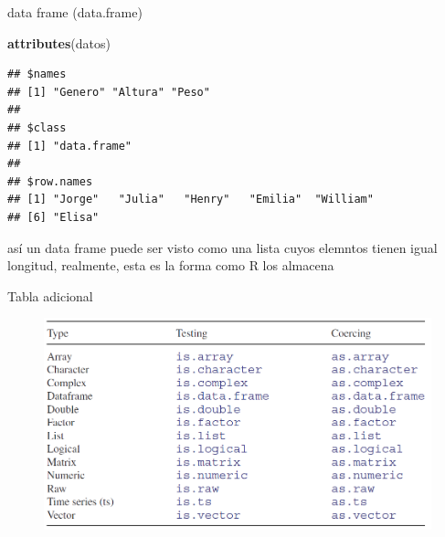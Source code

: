 \documentclass[ignorenonframetext,]{beamer}
\newenvironment{Shaded}{\begin{snugshade}}{\end{snugshade}}
\newcommand{\KeywordTok}[1]{\textcolor[rgb]{0.13,0.29,0.53}{\textbf{#1}}}
\newcommand{\NormalTok}[1]{#1}
\begin{document}
\begin{frame}[fragile]{data frame (data.frame)}

\begin{Shaded}
\begin{Highlighting}[]
\KeywordTok{attributes}\NormalTok{(datos)}
\end{Highlighting}
\end{Shaded}

\begin{verbatim}
## $names
## [1] "Genero" "Altura" "Peso"  
## 
## $class
## [1] "data.frame"
## 
## $row.names
## [1] "Jorge"   "Julia"   "Henry"   "Emilia"  "William"
## [6] "Elisa"
\end{verbatim}

así un data frame puede ser visto como una lista cuyos elemntos tienen
igual longitud, realmente, esta es la forma como R los almacena

\end{frame}

\begin{frame}{Tabla adicional}

\begin{center}
\begin{figure}
\includegraphics[scale=0.44]{coercion.png}
\end{figure}
\end{center}

\end{frame}
\end{document}
